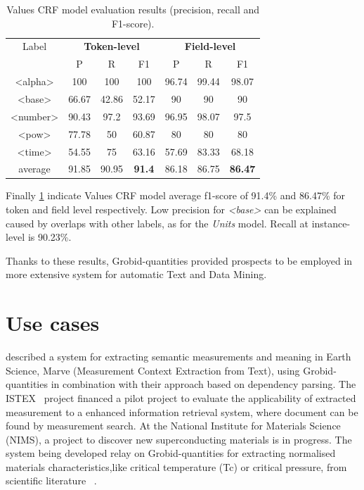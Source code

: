 \documentclass[sigplan, anonymous, review]{acmart}
\begin{document}
\begin{table}[ht]
  \caption{Values CRF model evaluation results (precision, recall and F1-score).}
  \label{tab:values-evaluation}
  \begin{tabular}{c|ccc|ccc}
    \toprule
    Label & \multicolumn{3}{c}{\textbf{Token-level}} & \multicolumn{3}{c}{\textbf{Field-level}}\\
    & P & R & F1 & P & R & F1 \\
    \midrule
    <alpha>       & 100   & 100   & 100   & 96.74 & 99.44 & 98.07   \\
    <base>        & 66.67 & 42.86 & 52.17 & 90    & 90    & 90      \\
    <number>      & 90.43 & 97.2  & 93.69 & 96.95 & 98.07 & 97.5    \\
    <pow>         & 77.78 & 50    & 60.87 & 80    & 80    & 80      \\
    <time>        & 54.55 & 75    & 63.16 & 57.69 & 83.33 & 68.18   \\
    \midrule
    average       & 91.85 & 90.95 & \textbf{91.4} & 86.18 & 86.75 & \textbf{86.47}   \\
    \bottomrule
     \end{tabular}
\end{table}

Finally \ref{tab:values-evaluation} indicate Values CRF model average f1-score of 91.4\% and 86.47\% for token and field level respectively. Low precision for \textit{<base>} can be explained caused by overlaps with other labels, as for the  \textit{Units} model. Recall at instance-level is 90.23\%.  

Thanks to these results, Grobid-quantities provided prospects to be employed in more extensive system for automatic Text and Data Mining. 

\section{Use cases}
\label{sec:use_cases}
\cite{hundman2017measurement} described a system for extracting semantic measurements and meaning in Earth Science, Marve (Measurement Context Extraction from Text), using Grobid-quantities in combination with their approach based on dependency parsing. The ISTEX~\cite{dazy2014istex} project financed a pilot project to evaluate the applicability of extracted measurement to a enhanced information retrieval system, where document can be found by measurement search. At the National Institute for Materials Science (NIMS), a project to discover new superconducting materials is in progress. The system being developed relay on Grobid-quantities for extracting normalised materials characteristics,like critical temperature (Tc) or critical pressure, from scientific literature ~\cite{foppiano2019proposal}. 
\end{document}
